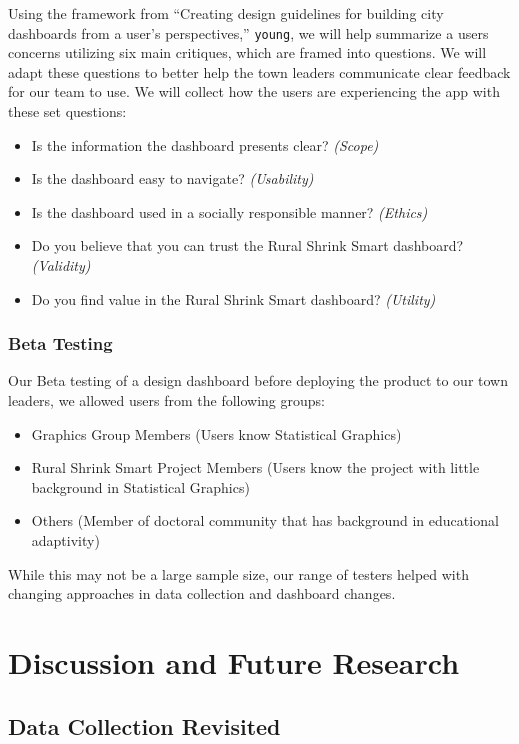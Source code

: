 \documentclass[letterpaper,inpress]{jdsart}
\begin{document}
Using the framework from ``Creating design guidelines for building city dashboards from a user's perspectives,'' \texttt{young}, we will help summarize a users concerns utilizing six main critiques, which are framed into questions. We will adapt these questions to better help the town leaders communicate clear feedback for our team to use. We will collect how the users are experiencing the app with these set questions:

\begin{itemize}
\item Is the information the dashboard presents clear? \textit{(Scope)}
\item Is the dashboard easy to navigate? \textit{(Usability)}
\item Is the dashboard used in a socially responsible manner? \textit{(Ethics)}
\item Do you believe that you can trust the Rural Shrink Smart dashboard? \textit{(Validity)}
\item Do you find value in the Rural Shrink Smart dashboard? \textit{(Utility)}
\end{itemize}

\subsubsection{Beta Testing}

Our Beta testing of a design dashboard before deploying the product to our town leaders, we allowed users from the following groups:

\begin{itemize}
    \item Graphics Group Members (Users know Statistical Graphics)
    \item Rural Shrink Smart Project Members (Users know the project with little background in Statistical Graphics)
    \item  Others (Member of doctoral community that has background in educational adaptivity)
\end{itemize}

While this may not be a large sample size, our range of testers helped with changing approaches in data collection and dashboard changes.

\section{Discussion and Future Research}

\subsection{Data Collection Revisited}
\end{document}
